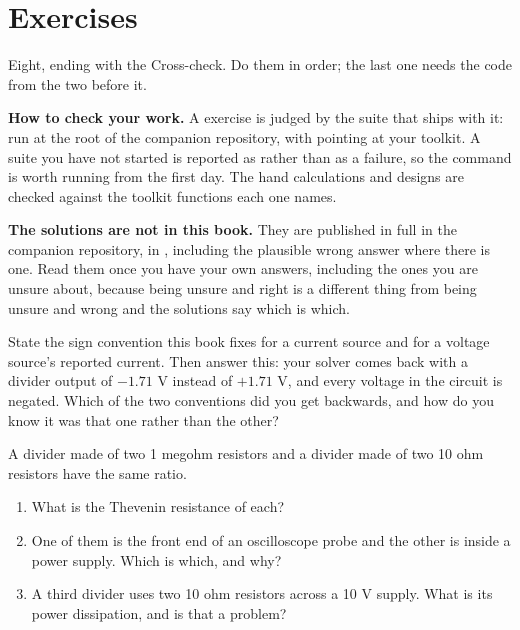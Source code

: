 
\section{Exercises}
\label{c1:sec:exercises}

Eight, ending with the Cross-check. Do them in order; the last one needs the code from the two before it.

\begin{aside}
\textbf{How to check your work.} A  exercise is judged by the suite that ships with it: run  at the root of the companion repository, with  pointing at your toolkit. A suite you have not started is reported as  rather than as a failure, so the command is worth running from the first day. The hand calculations and designs are checked against the toolkit functions each one names.

\textbf{The solutions are not in this book.} They are published in full in the companion repository, in , including the plausible wrong answer where there is one. Read them once you have your own answers, including the ones you are unsure about, because being unsure and right is a different thing from being unsure and wrong and the solutions say which is which.
\end{aside}

\label{c1:ex:1}
State the sign convention this book fixes for a current source and for a voltage source's reported current. Then answer this: your solver comes back with a divider output of $-1.71$ V instead of $+1.71$ V, and every voltage in the circuit is negated. Which of the two conventions did you get backwards, and how do you know it was that one rather than the other?

\label{c1:ex:2}
A divider made of two 1 megohm resistors and a divider made of two 10 ohm resistors have the same ratio.

\begin{enumerate}
  \item What is the Thevenin resistance of each?
  \item One of them is the front end of an oscilloscope probe and the other is inside a power supply. Which is which, and why?
  \item A third divider uses two 10 ohm resistors across a 10 V supply. What is its power dissipation, and is that a problem?
\end{enumerate}

